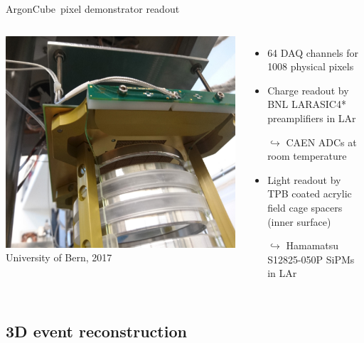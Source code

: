 \documentclass[]{beamer}
\newcommand*{\emphcol}{blue}
\newcommand*{\AC}{{ArgonCube}}
\begin{document}
\begin{frame}{\AC\ pixel demonstrator readout}
	\begin{columns}[c]
		\centering
		\includegraphics[width=\textwidth]{viper/viper_sipm}\\
		{\tiny University of Bern, 2017}\\
		\begin{itemize}
			\item \num{64} DAQ channels for \num{1008} physical pixels
			\item {\color{\emphcol} Charge readout by BNL LARASIC4* preamplifiers in LAr}
			\item[$\hookrightarrow$] CAEN ADCs at room temperature
			\item Light readout by TPB coated acrylic field cage spacers (inner surface)
			\item[$\hookrightarrow$] {\color{\emphcol} Hamamatsu S12825-050P SiPMs in LAr}
		\end{itemize}
	\end{columns}
\end{frame}

\subsection{3D event reconstruction}
\end{document}
